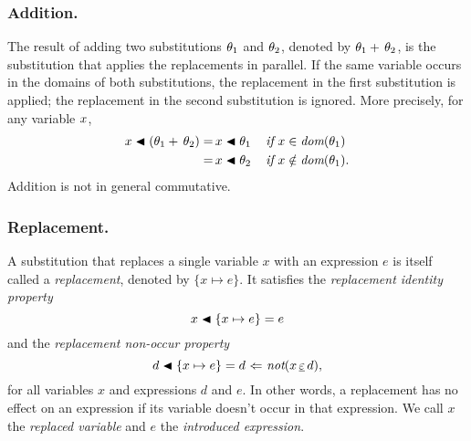 \documentclass[runningheads]{llncs}
\DeclareMathOperator{\unot}{\emph{not}\kern-.0pt}
\DeclareMathOperator{\uimpliedby}{\Leftarrow}
\DeclareMathOperator{\uif}{\emph{if}\,}
\begin{document}
\subsubsection{Addition.} The result of adding two substitutions $\theta_{1}$ and $\theta_{2}$, denoted by $\theta_{1} + \, \theta_{2}$, is the substitution that applies the replacements in parallel.  If the same variable occurs in the domains of both substitutions, the replacement in the first substitution is applied; the replacement in the second substitution is ignored.  More precisely, for any variable $x$,
\[\begin{split}
\var{x} \apply (\thet{1}\addto \thet{2})= \, &\var{x} \apply  \thet{1} &&\uif \var{x} \in \dom(\thet{1})  \\
    = \, &\var{x} \apply \thet{2} &&\uif \var{x} \notin \dom(\thet{1}).
\end{split} \]   Addition is not in general commutative.



\subsubsection{Replacement.} A substitution that replaces a single variable $x$ with an expression $e$ is itself called a \emph{replacement}, denoted by $\{x \mapsto e\} $.  It satisfies the \emph{replacement identity property}
\[x \blacktriangleleft  \{x \mapsto e\}  = e\]
 and the \emph{replacement non-occur property}
\[d \apply  \{x \mapsto e\}  = d \, \uimpliedby  \,   \unot(x \occurseq d),\]
for all variables $x$ and expressions $d$ and $e$. In other words, a replacement has no effect on an expression if its variable doesn't occur in that expression. We call $x$ the \emph{replaced variable} and $e$ the \emph{introduced expression}.
\end{document}
